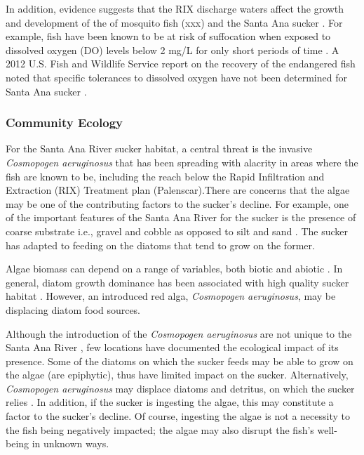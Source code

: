 \documentclass{article}
\begin{document}
In addition, evidence suggests that the RIX discharge waters affect the growth and development of the of mosquito fish (xxx) and the Santa Ana sucker \citep{jenkins2009effects}. For example, fish have been known to be at risk of suffocation when exposed to dissolved oxygen (DO) levels below 2 mg/L for only short periods of time \citep{REF}. A 2012 U.S. Fish and Wildlife Service report on the recovery of the endangered fish noted that specific tolerances to dissolved oxygen have not been determined for  Santa Ana sucker \citep{evans2005draft}.

\subsubsection{Community Ecology}

For the Santa Ana River sucker habitat, a central threat is the invasive \emph{Cosmopogen aeruginosus} that has been spreading with alacrity in areas where the fish are known to be, including the reach below the Rapid Infiltration and Extraction (RIX) Treatment plan (Palenscar).There are concerns that the algae may be one of the contributing factors to the sucker's decline. For example, one of the important features of the Santa Ana River for the sucker is the presence of coarse substrate i.e., gravel and cobble as opposed to silt and sand \citep{thompson2010influence}. The sucker has adapted to feeding on the diatoms that tend to grow on the former. 

Algae biomass can depend on a range of variables, both biotic and abiotic \citep{winkelmann2014top}. In general, diatom growth dominance has been associated with high quality sucker habitat \citep{REF}. However, an introduced red alga, \emph{Cosmopogen aeruginosus}, may be displacing diatom food sources. 

Although the introduction of the \emph{Cosmopogen aeruginosus} are not unique to the Santa Ana River \citep{vzakova2013new}, few locations have documented the ecological impact of its presence. Some of the diatoms on which the sucker feeds may be able to grow on the algae (are epiphytic), thus have limited impact on the sucker. Alternatively, \emph{Cosmopogen aeruginosus} may displace diatoms and detritus, on which the sucker relies \citep{thompson2010influence}. In addition, if the sucker is ingesting the algae, this may constitute a factor to the sucker's decline. Of course, ingesting the algae is not a necessity to the fish being negatively impacted; the algae may also disrupt the fish's well-being in unknown ways. 
\end{document}
